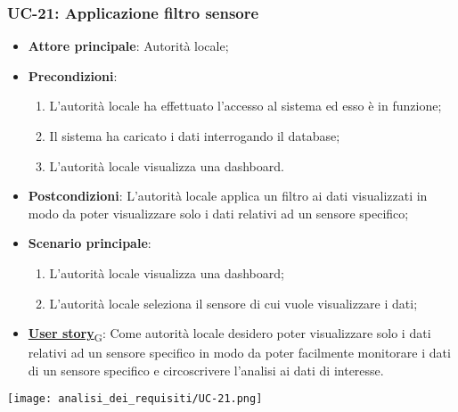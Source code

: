 \subsubsection{UC-21: Applicazione filtro sensore}
\begin{itemize}
	\item \textbf{Attore principale}: Autorità locale;
	\item \textbf{Precondizioni}:
	      \begin{enumerate}
		      \item L'autorità locale ha effettuato l'accesso al sistema ed esso è in funzione;
		      \item Il sistema ha caricato i dati interrogando il database;
		      \item L'autorità locale visualizza una dashboard.
	      \end{enumerate}
	\item \textbf{Postcondizioni}: L'autorità locale applica un filtro ai dati visualizzati in modo da poter visualizzare solo i dati relativi ad un sensore specifico;
	\item \textbf{Scenario principale}:
	      \begin{enumerate}
		      \item L'autorità locale visualizza una dashboard;
		      \item L'autorità locale seleziona il sensore di cui vuole visualizzare i dati;
	      \end{enumerate}
	\item \href{https://7last.github.io/docs/rtb/documentazione-interna/glossario\#user-story}{\textbf{User story}\textsubscript{G}}:
	      Come autorità locale desidero poter visualizzare solo i dati relativi ad un sensore specifico in modo da poter facilmente
	      monitorare i dati di un sensore specifico e circoscrivere l'analisi ai dati di interesse.
\end{itemize}
\begin{center}
	\texttt{[image: analisi\_dei\_requisiti/UC-21.png]}
\end{center}
